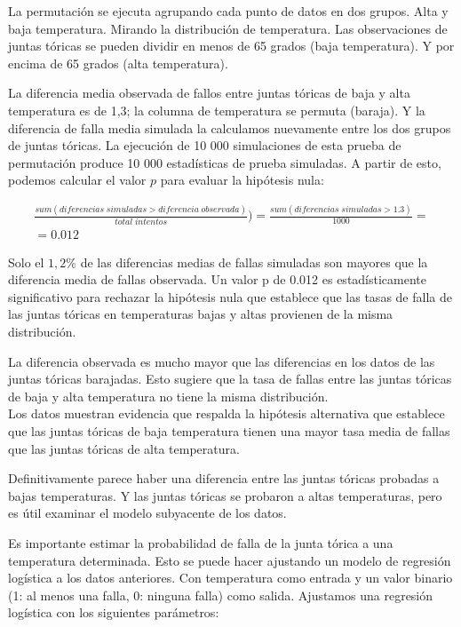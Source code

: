 La permutación se ejecuta agrupando cada punto de datos en dos grupos. Alta y
baja temperatura. Mirando la distribución de temperatura. Las observaciones de
juntas tóricas se pueden dividir en menos de 65 grados (baja temperatura). Y por
encima de 65 grados (alta temperatura).

La diferencia media observada de fallos entre juntas tóricas de baja y alta
temperatura es de 1,3; la columna de temperatura se permuta (baraja). Y la
diferencia de falla media simulada la calculamos nuevamente entre los dos grupos
de juntas tóricas. La ejecución de 10 000 simulaciones de esta prueba de
permutación produce 10 000 estadísticas de prueba simuladas. A partir de esto,
podemos calcular el valor $p$ para evaluar la hipótesis nula:


\begin{center}  
\begin{align*} 
\frac{sum(diferencias\;simuladas> diferencia\;observada)}{total\; intentos}) = \frac{sum(diferencias \;simuladas>1.3)}{1000}= \\
=0.012
\end{align*}
\end{center}



Solo el $1,2 \%$ de las diferencias medias de fallas simuladas son mayores que
la diferencia media de fallas observada. Un valor p de 0.012 es estadísticamente
significativo para rechazar la hipótesis nula que establece que las tasas de
falla de las juntas tóricas en temperaturas bajas y altas provienen de la misma
distribución.

La diferencia observada es mucho mayor que las diferencias en los datos de las
juntas tóricas barajadas. Esto sugiere que la tasa de fallas entre las juntas
tóricas de baja y alta temperatura no tiene la misma distribución. \\Los datos
muestran evidencia que respalda la hipótesis alternativa que establece que las
juntas tóricas de baja temperatura tienen una mayor tasa media de fallas que las
juntas tóricas de alta temperatura.

Definitivamente parece haber una diferencia entre las juntas tóricas probadas a
bajas temperaturas. Y las juntas tóricas se probaron a altas temperaturas, pero
es útil examinar el modelo subyacente de los datos.

Es importante estimar la probabilidad de falla de la junta tórica a una
temperatura determinada. Esto se puede hacer ajustando un modelo de regresión
logística a los datos anteriores. Con temperatura como entrada y un valor
binario (1: al menos una falla, 0: ninguna falla) como salida. Ajustamos una
regresión logística con los siguientes parámetros:


